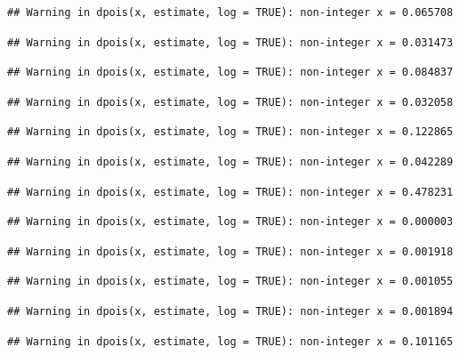 \documentclass[]{article}
\begin{document}
\begin{verbatim}
## Warning in dpois(x, estimate, log = TRUE): non-integer x = 0.065708
\end{verbatim}

\begin{verbatim}
## Warning in dpois(x, estimate, log = TRUE): non-integer x = 0.031473
\end{verbatim}

\begin{verbatim}
## Warning in dpois(x, estimate, log = TRUE): non-integer x = 0.084837
\end{verbatim}

\begin{verbatim}
## Warning in dpois(x, estimate, log = TRUE): non-integer x = 0.032058
\end{verbatim}

\begin{verbatim}
## Warning in dpois(x, estimate, log = TRUE): non-integer x = 0.122865
\end{verbatim}

\begin{verbatim}
## Warning in dpois(x, estimate, log = TRUE): non-integer x = 0.042289
\end{verbatim}

\begin{verbatim}
## Warning in dpois(x, estimate, log = TRUE): non-integer x = 0.478231
\end{verbatim}

\begin{verbatim}
## Warning in dpois(x, estimate, log = TRUE): non-integer x = 0.000003
\end{verbatim}

\begin{verbatim}
## Warning in dpois(x, estimate, log = TRUE): non-integer x = 0.001918
\end{verbatim}

\begin{verbatim}
## Warning in dpois(x, estimate, log = TRUE): non-integer x = 0.001055
\end{verbatim}

\begin{verbatim}
## Warning in dpois(x, estimate, log = TRUE): non-integer x = 0.001894
\end{verbatim}

\begin{verbatim}
## Warning in dpois(x, estimate, log = TRUE): non-integer x = 0.101165
\end{verbatim}
\end{document}
